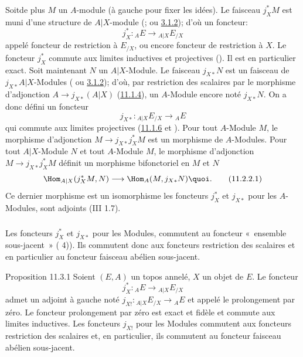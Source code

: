 \documentclass[10pt]{../fichiers-configuration-latex/smfart}
\begin{document}
\subsubsection{}
Soit\pageoriginale de plus $M$ un $A$-module (à gauche pour fixer
les idées). Le faisceau $j^{\ast}_XM$ est muni d'une structure de
$A| X$-module (; ou \hyperref[IV.subsubsec3.1.2]{3.1.2}); d'où
un foncteur:
$$
j^{\ast}_X:{}_AE\longrightarrow {}_{A| X}E_{/X}
$$
appelé foncteur de restriction à $E_{/X}$, ou encore foncteur de
restriction à $X$. Le foncteur $j^{\ast}_X$ commute aux limites
inductives et projectives (\loccit). Il est en particulier exact.
Soit maintenant $N$ un $A| X$-Module. Le faisceau $j_{X\ast}N$ est
un faisceau de $j_{X\ast}A| X$-Modules ( ou 
\hyperref[IV.subsubsec3.1.2]{3.1.2}); d'où, par restriction des scalaires par le
morphisme d'adjonction $A\rightarrow j_{X\ast}(A| X)$
(\hyperref[IV.subsubsec11.1.4]{11.1.4}), un $A$-Module encore noté
$j_{X\ast}N$. On a donc défini un foncteur
$$
j_{X\ast}:{}_{A| X}E_{/X}\longrightarrow {}_AE
$$
qui commute aux limites projectives (\hyperref[IV.prop11.1.6]{11.1.6} et
). Pour tout $A$-Module $M$, le morphisme
d'adjonction $M\rightarrow j_{X\ast}j^{\ast}_XM$ est un morphisme de
$A$-Modules. Pour tout $A| X$-Module $N$ et tout $A$-Module $M$, le
morphisme d'adjonction $M\rightarrow j_{X\ast}j^{\ast}_XM$ définit
un morphisme bifonctoriel en $M$ et $N$
\begin{equation*}
\Hom_{A| X}(j^{\ast}_XM,N)\longrightarrow
\Hom_A(M,j_{X\ast}N){\quoi}.\tag{11.2.2.1}
\end{equation*}
Ce dernier morphisme est un isomorphisme \ie les foncteurs
$j^{\ast}_X$ et $j_{X\ast}$ pour les $A$-Modules, sont adjoints (III
1.7).

\subsubsection{}
Les foncteurs $j^{\ast}_X$ et $j_{X\ast}$ pour les Modules,
commutent au foncteur « ensemble sous-jacent »
( 4)). Ils commutent donc aux foncteurs restriction
des scalaires et en particulier au foncteur faisceau abélien
sous-jacent.

\setcounter{subsection}{3} \setcounter{subsubsection}{0}
\begin{enonce*}{Proposition 11.3.1}
Soient $(E,A)$ un topos annelé, $X$ un objet de $E$. Le foncteur
$$
j^{\ast}_X:{}_{A}E\longrightarrow {}_{A| X}E_{/X}
$$
admet un adjoint à gauche noté $j_{X!}:{}_{A| X}E_{/X}\rightarrow
{}_{A}E$ et appelé le prolongement par zéro. Le foncteur
prolongement par zéro est exact et fidèle et commute aux limites
inductives. Les foncteurs $j_{X!}$ pour les Modules\pageoriginale
commutent aux foncteurs restriction des scalaires et, en
particulier, ils commutent au foncteur faisceau abélien sous-jacent.
\end{enonce*}
\end{document}
